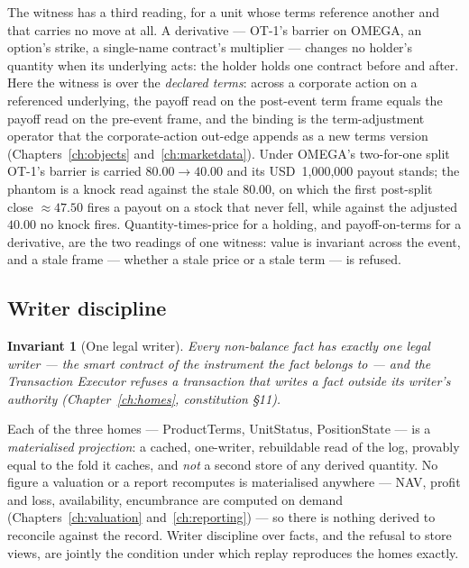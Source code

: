 \documentclass[11pt,a4paper]{article}
\newcommand{\USD}[1]{\mbox{USD~#1}}
\newtheorem{invariant}[definition]{Invariant}
\begin{document}
The witness has a third reading, for a unit whose terms reference another and that carries
no move at all. A derivative --- OT-1's barrier on OMEGA, an option's strike, a single-name
contract's multiplier --- changes no holder's quantity when its underlying acts: the holder
holds one contract before and after. Here the witness is over the \emph{declared terms}:
across a corporate action on a referenced underlying, the payoff read on the post-event term
frame equals the payoff read on the pre-event frame, and the binding is the term-adjustment
operator that the corporate-action out-edge appends as a new terms version
(Chapters~\ref{ch:objects} and~\ref{ch:marketdata}). Under OMEGA's two-for-one split OT-1's
barrier is carried $80.00 \rightarrow 40.00$ and its \USD{1{,}000{,}000} payout stands; the
phantom is a knock read against the stale $80.00$, on which the first post-split close
$\approx 47.50$ fires a payout on a stock that never fell, while against the adjusted $40.00$
no knock fires. Quantity-times-price for a holding, and payoff-on-terms for a derivative, are
the two readings of one witness: value is invariant across the event, and a stale frame ---
whether a stale price or a stale term --- is refused.

\subsection{Writer discipline}

\begin{invariant}[One legal writer]\label{inv:writer}
Every non-balance fact has exactly one legal writer --- the smart contract of the
instrument the fact belongs to --- and the Transaction Executor refuses a
transaction that writes a fact outside its writer's authority
(Chapter~\ref{ch:homes}, constitution \S 11).
\end{invariant}

Each of the three homes --- ProductTerms, UnitStatus, PositionState --- is a
\emph{materialised projection}: a cached, one-writer,
rebuildable read of the log, provably equal to the fold it caches, and \emph{not}
a second store of any derived quantity. No figure a valuation or a report
recomputes is materialised anywhere --- NAV, profit and loss, availability,
encumbrance are computed on demand (Chapters~\ref{ch:valuation}
and~\ref{ch:reporting}) --- so there is nothing derived to reconcile against the
record. Writer discipline over facts, and the refusal to store views, are jointly
the condition under which replay reproduces the homes exactly.
\end{document}
